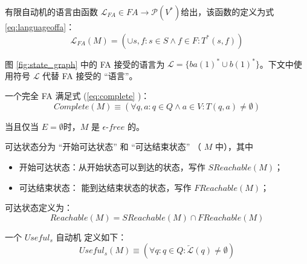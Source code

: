 \begin{definition}
    有限自动机的语言由函数 $\mathcal{L}_{FA} \in FA \longrightarrow \mathcal{P}(V^*) $给出，该函数的定义为式 \ref{eq:languageoffa}： 
    \begin{equation}\label{eq:languageoffa}
        \mathcal{L}_{FA} (M) = (\cup s,f:s \in S \land f \in F : T^* (s,f))
    \end{equation}
\end{definition}

\begin{example}[FA 的语言]
    图 \ref{fig:state_graph} 中的 FA 接受的语言为 $ \mathcal{L}= \{ ba(1)^*\cup b(1)^* \}$。下文中使用符号 $\mathcal{L}$ 代替 FA 接受的 “语言”。
\end{example}

\begin{definition}\label{def:complete}
    一个完全 FA 满足式 (\ref{eq:complete} )：
    \begin{equation} \label{eq:complete}
        Complete(M) \equiv ( \forall q,a:q\in Q \land a \in V : T(q,a) \not= \emptyset ) 
    \end{equation}
\end{definition}

\begin{definition}
    当且仅当 $E=\emptyset$时，$M$ 是 $\epsilon$-$free$ 的。
\end{definition}

\begin{definition}\label{def:rechable-state}
    可达状态分为 “开始可达状态” 和 “可达结束状态” （ $M$ 中），其中
    \begin{itemize}
        \item 开始可达状态：从开始状态可以到达的状态，写作 $SReachable(M)$；
        \item 可达结束状态： 能到达结束状态的状态，写作 $FReachable(M)$；
    \end{itemize}
    可达状态定义为：
    \[ Reachable(M) = SReachable(M) \cap FReachable(M) \]
\end{definition}

\begin{definition}
    一个 $Useful_s$ 自动机 定义如下： 
    \[ Useful_s (M) \equiv ( \forall q:q \in Q : \overleftarrow{\mathcal{L}} (q) \not= \emptyset ) \]
\end{definition}

